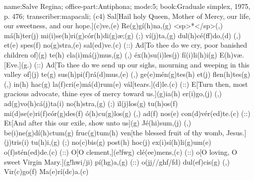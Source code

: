 name:Salve Regina;
office-part:Antiphona;
mode:5;
book:Graduale simplex, 1975, p. 476;
transcriber:mapacali;
(c4) Sal[Hail holy Queen, Mother of Mercy, our life, our sweetness, and our hope.](c)ve,(e) Re(g)gí(h)na,(g) <sp>*</sp>(,) má(h)ter(j) mi(i)se(h)ri(g)cór(h)di(g)æ;(g) (;) ví(j)ta,(g) dul(h)cé(ff)do,(d) (,) et(e) spes(f) no(g)stra,(e) sal(ed)ve.(c) (::) Ad[To thee do we cry, poor banished children of](g) te(h) cla(i)má(j)mus,(g) (,) éx(h)su(i)les(j) fí(i)li(h)i(g) E(h)væ.[Eve.](g.) (::) Ad[To thee do we send up our sighs, mourning and weeping in this valley of](j) te(g) sus(h)pi(f)rá(d)mus,(e) (,) ge(e)mén(g)tes(h) et(j) flen(h)tes(g) (,) in(h) hac(g) la(f)cri(e)má(d)rum(e) vál[tears.](d)le.(c) (::) E[Turn then, most gracious advocate, thine eyes of mercy toward us.](g)ia(h) er(i)go,(j) (,) ad(g)vo(h)cá(j)ta(i) no(h)stra,(g) (;) il(j)los(g) tu(h)os(f) mi(d)se(e)ri(f)cór(g)des(f) ó(h)cu(g)los(g) (,) ad(f) nos(e) con(d)vér(ed)te.(c) (::) Et[And after this our exile, show unto us](g) Jé(hi)sum,(j) (,) be(i)ne(g)dí(h)ctum(g) fruc(g)tum(h) ven[the blessed fruit of thy womb, Jesus.](j)tris(i) tu(h)i,(g) (;) no(c)bis(g) post(h) hoc(j) ex(i)sí(h)li(g)um(e) o(f)stén(ed)de.(c) (::) O[O clement,](e!fwg) clé(ee)mens,(c) (::) o[O loving, O sweet Virgin Mary.](g!hwi/ji) pí(hg)a,(g) (::) o(jj//ghf/fd) dul(ef)cis(g) (,) Vir(c)go(f) Ma(e)rí(dc)a.(c) 
